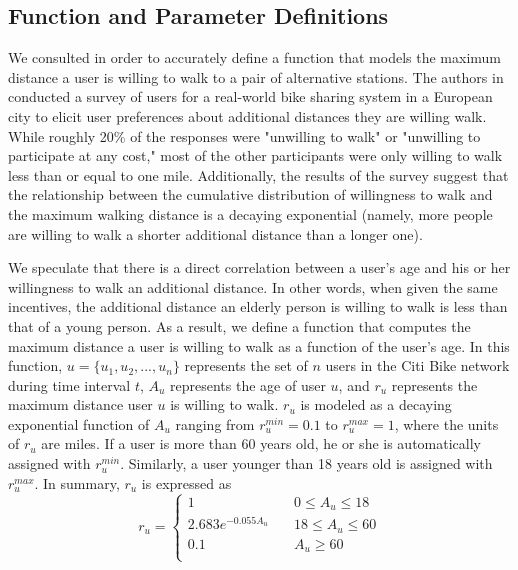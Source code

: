 \documentclass[times, 10pt,twocolumn]{article}
\begin{document}
\subsection{Function and Parameter Definitions}

We consulted \cite{incentives} in order to accurately define a function that models the maximum distance a user is willing to walk to a pair of alternative stations. The authors in \cite{incentives} conducted a survey of users for a real-world bike sharing system in a European city to elicit user preferences about additional distances they are willing walk. While roughly 20\% of the responses were "unwilling to walk" or "unwilling to participate at any cost," most of the other participants were only willing to walk less than or equal to one mile. Additionally, the results of the survey suggest that the relationship between the cumulative distribution of willingness to walk and the maximum walking distance is a decaying exponential (namely, more people are willing to walk a shorter additional distance than a longer one).

We speculate that there is a direct correlation between a user's age and his or her willingness to walk an additional distance. In other words, when given the same incentives, the additional distance an elderly person is willing to walk is less than that of a young person. As a result, we define a function that computes the maximum distance a user is willing to walk as a function of the user's age. In this function, $u = \{u_1, u_2, ..., u_n\}$ represents the set of $n$ users in the Citi Bike network during time interval $t$, $A_u$ represents the age of user $u$, and $r_u$ represents the maximum distance user $u$ is willing to walk. $r_u$ is modeled as a decaying exponential function of $A_u$ ranging from $r_u^{min} = 0.1$ to $r_u^{max} = 1$, where the units of $r_u$ are miles. If a user is more than 60 years old, he or she is automatically assigned with $r_u^{min}$. Similarly, a user younger than 18 years old is assigned with $r_u^{max}$. In summary, $r_u$ is expressed as
\begin{equation}
r_u = \left\{
        \begin{array}{lll}
            1 & \quad 0 \leq A_u \leq 18 \\
            2.683e^{-0.055A_u} & \quad 18 \leq A_u \leq 60 \\
            0.1 & \quad A_u \geq 60 \\
        \end{array}
    \right.
\end{equation}
\end{document}
